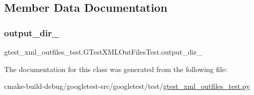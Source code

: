 \subsection{Member Data Documentation}
\mbox{\label{classgtest__xml__outfiles__test_1_1GTestXMLOutFilesTest_aa5c31cd97047bc1d3060f4d27bc956a4}} 
\subsubsection{\texorpdfstring{output\_dir\_}{output\_dir\_}}
{\footnotesize\ttfamily gtest\+\_\+xml\+\_\+outfiles\+\_\+test.\+G\+Test\+X\+M\+L\+Out\+Files\+Test.\+output\+\_\+dir\+\_\+}



The documentation for this class was generated from the following file\+:\begin{DoxyCompactItemize}
\item 
cmake-\/build-\/debug/googletest-\/src/googletest/test/\mbox{\hyperlink{gtest__xml__outfiles__test_8py}{gtest\+\_\+xml\+\_\+outfiles\+\_\+test.\+py}}\end{DoxyCompactItemize}
